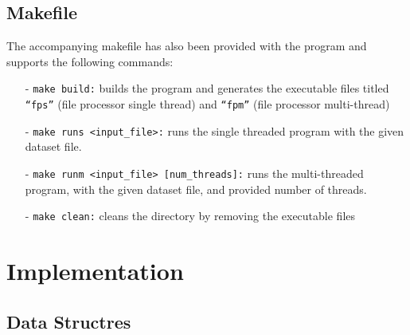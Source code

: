 \documentclass{article}
\theoremstyle{mytheoremstyle}
\theoremstyle{mytheoremstyle}
\theoremstyle{myproblemstyle}
\begin{document}
\subsection{Makefile}
The accompanying makefile has also been provided with the program and supports the following commands: \vspace*{-2mm}
\begin{mdframed}
  \begin{itemize}
    \item[-] \texttt{make build:} builds the program and generates the executable files titled \texttt{``fps''} (file processor single thread) and \texttt{``fpm''} (file processor multi-thread) \vspace*{-1mm}
    \item[-] \texttt{make runs <input\_file>:} runs the single threaded program with the given dataset file.  \vspace*{-1mm}
    \item[-] \texttt{make runm <input\_file> [num\_threads]:} runs the multi-threaded program, with the given dataset file, and provided number of threads. \vspace*{-1mm}
    \item[-] \texttt{make clean:}  cleans the directory by removing the executable files \vspace*{-1mm}
  \end{itemize}
\end{mdframed}
\newpage
\section{Implementation}
\subsection{Data Structres}
\end{document}

